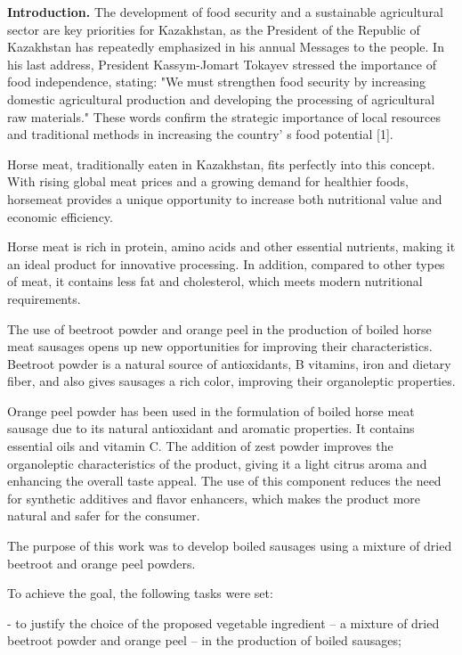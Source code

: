 \begin{multicols}{2}
{\bfseries Introduction.} The development of food security and a
sustainable agricultural sector are key priorities for Kazakhstan, as
the President of the Republic of Kazakhstan has repeatedly emphasized in
his annual Messages to the people. In his last address, President
Kassym-Jomart Tokayev stressed the importance of food independence,
stating: "We must strengthen food security by increasing domestic
agricultural production and developing the processing of agricultural
raw materials." These words confirm the strategic importance of local
resources and traditional methods in increasing the
country' s food potential {[}1{]}.

Horse meat, traditionally eaten in Kazakhstan, fits perfectly into this
concept. With rising global meat prices and a growing demand for
healthier foods, horsemeat provides a unique opportunity to increase
both nutritional value and economic efficiency.

Horse meat is rich in protein, amino acids and other essential
nutrients, making it an ideal product for innovative processing. In
addition, compared to other types of meat, it contains less fat and
cholesterol, which meets modern nutritional requirements.

The use of beetroot powder and orange peel in the production of boiled
horse meat sausages opens up new opportunities for improving their
characteristics. Beetroot powder is a natural source of antioxidants, B
vitamins, iron and dietary fiber, and also gives sausages a rich color,
improving their organoleptic properties.

Orange peel powder has been used in the formulation of boiled horse meat
sausage due to its natural antioxidant and aromatic properties. It
contains essential oils and vitamin C. The addition of zest powder
improves the organoleptic characteristics of the product, giving it a
light citrus aroma and enhancing the overall taste appeal. The use of
this component reduces the need for synthetic additives and flavor
enhancers, which makes the product more natural and safer for the
consumer.

The purpose of this work was to develop boiled sausages using a mixture
of dried beetroot and orange peel powders.

To achieve the goal, the following tasks were set:

- to justify the choice of the proposed vegetable ingredient -- a
mixture of dried beetroot powder and orange peel -- in the production of
boiled sausages;


\end{multicols}
